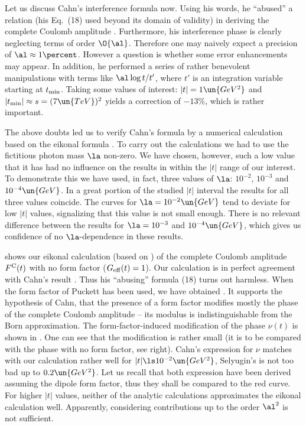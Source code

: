 
Let us discuss Cahn's interference formula  now. Using his words, he ``abused'' a relation (his Eq.~(18) used beyond its domain of validity) in deriving the complete Coulomb amplitude . Furthermore, his interference phase is clearly neglecting terms of order $\O{\al}$. Therefore one may naively expect a precision of $\al\approx 1\percent$. However a question is whether some error enhancements may appear. In addition, he performed a series of rather benevolent manipulations with terms like $\al \log t/ t'$, where $t'$ is an integration variable starting at $t_{\rm min}$. Taking some values of interest: $|t| = 1\un{GeV^2}$ and $|t_{\rm min}| \approx s = (7\un{TeV})^2$ yields a correction of $-13\percent$, which is rather important.

The above doubts led us to verify Cahn's formula by a numerical calculation based on the eikonal formula . To carry out the calculations we had to use the fictitious photon mass $\la$ non-zero. We have chosen, however, such a low value that it has had no influence on the results in within the $|t|$ range of our interest. To demonstrate this we have used, in fact, three values of $\la$: $10^{-2}$, $10^{-3}$ and $10^{-4}\un{GeV}$. In a great portion of the studied $|t|$ interval the results for all three values coincide. The curves for $\la = 10^{-2} \un{GeV}$ tend to deviate for low $|t|$ values, signalizing that this value is not small enough. There is no relevant difference between the results for $\la = 10^{-3}$ and $10^{-4}\un{GeV}$, which gives us confidence of no $\la$-dependence in these results.

 shows our eikonal calculation (based on ) of the complete Coulomb amplitude $F^{\rm C}(t)$ with no form factor ($G_{\rm eff}(t) = 1$). Our calculation is in perfect agreement with Cahn's result . Thus his ``abusing'' formula (18) turns out harmless. When the form factor of Puckett has been used, we have obtained . It supports the hypothesis of Cahn, that the presence of a form factor modifies mostly the phase of the complete Coulomb amplitude -- its modulus is indistinguishable from the Born approximation. The form-factor-induced modification of the phase $\nu(t)$ is shown in . One can see that the modification is rather small (it is to be compared with the phase with no form factor, see  right). Cahn's expression for $\nu$ matches with our calculation rather well for $|t| \ls 10^{-2}\un{GeV^2}$, Selyugin's is not too bad up to $0.2\un{GeV^2}$. Let us recall that both expression have been derived assuming the dipole form factor, thus they shall be compared to the red curve. For higher $|t|$ values, neither of the analytic calculations approximates the eikonal calculation well. Apparently, considering contributions up to the order $\al^2$ is not sufficient.

